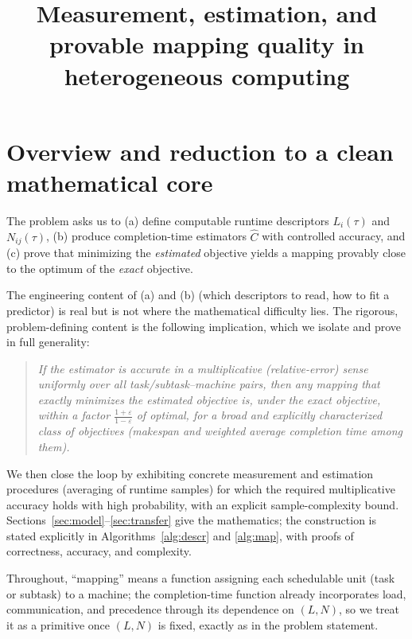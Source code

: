 \documentclass{amsart}
\theoremstyle{definition}
\newcommand{\Chat}{\widehat{C}}
\begin{document}
\title{Measurement, estimation, and provable mapping quality in heterogeneous computing}
\maketitle

\section{Overview and reduction to a clean mathematical core}

The problem asks us to (a) define computable runtime descriptors $L_i(\tau)$ and
$N_{ij}(\tau)$, (b) produce completion-time estimators $\Chat$ with controlled
accuracy, and (c) prove that minimizing the \emph{estimated} objective yields a
mapping provably close to the optimum of the \emph{exact} objective.

The engineering content of (a) and (b) (which descriptors to read, how to fit a
predictor) is real but is not where the mathematical difficulty lies. The
rigorous, problem-defining content is the following implication, which we isolate
and prove in full generality:

\begin{quote}
\emph{If the estimator is accurate in a multiplicative (relative-error) sense
uniformly over all task/subtask--machine pairs, then any mapping that exactly
minimizes the estimated objective is, under the exact objective, within a factor
$\frac{1+\varepsilon}{1-\varepsilon}$ of optimal, for a broad and explicitly
characterized class of objectives (makespan and weighted average completion time
among them).}
\end{quote}

We then close the loop by exhibiting concrete measurement and estimation
procedures (averaging of runtime samples) for which the required multiplicative
accuracy holds with high probability, with an explicit sample-complexity bound.
Sections~\ref{sec:model}--\ref{sec:transfer} give the mathematics; the
construction is stated explicitly in Algorithms~\ref{alg:descr} and
\ref{alg:map}, with proofs of correctness, accuracy, and complexity.

Throughout, ``mapping'' means a function assigning each schedulable unit (task or
subtask) to a machine; the completion-time function already incorporates load,
communication, and precedence through its dependence on $(L,N)$, so we treat it
as a primitive once $(L,N)$ is fixed, exactly as in the problem statement.
\end{document}
